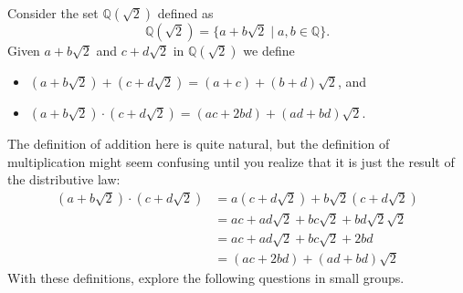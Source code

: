 \documentclass[11pt]{article}
\theoremstyle{definition}
\begin{document}
  Consider the set $\mathbb{Q}(\sqrt{2})$ defined as
  \[ \mathbb{Q}(\sqrt{2}) = \{ a + b\sqrt{2} \mid a, b\in \mathbb{Q}\}. \]
  Given $a+b\sqrt{2}$ and $c+d\sqrt{2}$ in $\mathbb{Q}(\sqrt{2})$ we define
  \begin{itemize}
    \item $(a+b\sqrt{2})+(c+d\sqrt{2}) = (a+c) + (b+d)\sqrt{2}$, and
    \item $(a+b\sqrt{2})\cdot (c+d\sqrt{2}) = (ac + 2bd) + (ad +bd)\sqrt{2}$.
  \end{itemize}
  The definition of addition here is quite natural, but the definition of multiplication might seem confusing until you realize that it is just
  the result of the distributive law:
  \begin{align*}
    (a+b\sqrt{2})\cdot (c+d\sqrt{2}) &= a(c+d\sqrt{2}) + b\sqrt{2}(c+d\sqrt{2})\\
                                     &= ac + ad\sqrt{2} + bc\sqrt{2} + bd \sqrt{2}\sqrt{2}\\
                                     &= ac + ad\sqrt{2} + bc\sqrt{2} + 2bd\\
                                     &= (ac + 2bd) + (ad +bd)\sqrt{2}
  \end{align*}
  With these definitions, explore the following questions in small groups.
\end{document}
